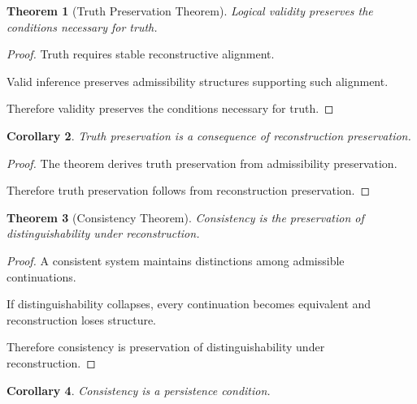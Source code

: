 \documentclass[12pt,oneside]{article}
\newtheorem{theorem}{Theorem}[section] \newtheorem{lemma}[theorem]{Lemma} \newtheorem{proposition}[theorem]{Proposition} \newtheorem{corollary}[theorem]{Corollary}
\theoremstyle{definition}
\begin{document}
\begin{theorem}[Truth Preservation Theorem]

Logical validity preserves the conditions necessary for truth.

\end{theorem}

\begin{proof}

Truth requires stable reconstructive alignment.

Valid inference preserves admissibility structures supporting such alignment.

Therefore validity preserves the conditions necessary for truth.

\end{proof}

\begin{corollary}

Truth preservation is a consequence of reconstruction preservation.

\end{corollary}

\begin{proof}

The theorem derives truth preservation from admissibility preservation.

Therefore truth preservation follows from reconstruction preservation.

\end{proof}

\begin{theorem}[Consistency Theorem]

Consistency is the preservation of distinguishability under reconstruction.

\end{theorem}

\begin{proof}

A consistent system maintains distinctions among admissible continuations.

If distinguishability collapses, every continuation becomes equivalent and reconstruction loses structure.

Therefore consistency is preservation of distinguishability under reconstruction.

\end{proof}

\begin{corollary}

Consistency is a persistence condition.

\end{corollary}
\end{document}
